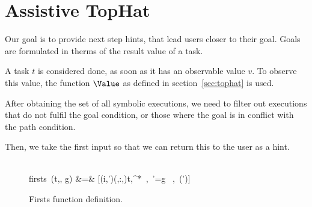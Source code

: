 
\section{Assistive TopHat}
\label{sec:assistive}

Our goal is to provide next step hints, that lead users closer to their goal.
Goals are formulated in therms of the result value of a task.

A task $t$ is considered done, as soon as it has an observable value $v$.
To observe this value, the function $\Value$ as defined in section~\ref{sec:tophat} is used.

After obtaining the set of all symbolic executions, we need to filter out executions that do not fulfil the goal condition, or those where the goal is in conflict with the path condition.

Then, we take the first input so that we can return this to the user as a hint.

\begin{figure*}[t]
  \begin{function}
    \signature{firsts :  \times {} \times {}
      \rightarrow {}} \\
    firsts\ (t,\sigma, g) &=& [(i,\Phi')\mid (,:,\Phi)\leftarrow t,\sigma\drive{}^*\ ,\ \Phi'=\Phi\land g \ ,\  \Sat(\Phi')]
  \end{function}
  \caption{Firsts function definition.}
  \label{fig:firsts}
\end{figure*}
